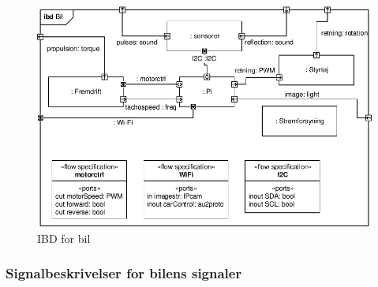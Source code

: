 \begin{figure}[h]
\centering
\includegraphics[scale=1]{../fig/diagrammer/bil/ibd_bil.pdf}
\caption{IBD for bil}
\label{fig:ibd_bil}
\end{figure}

\subsubsection{Signalbeskrivelser for bilens signaler}

